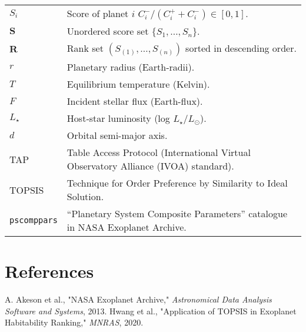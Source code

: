 \documentclass[12pt]{article}
\begin{document}
\begin{tabular}{ll}
$S_i$ & Score of planet $i$ 
$C_i^{-}/(C_i^{+}+C_i^{-})\in[0,1]$.\\
$\mathbf{S}$ & Unordered score set $\{S_1,\dots,S_n\}$.\\
$\mathbf{R}$ & Rank set $(S_{(1)},\dots,S_{(n)})$ sorted in descending order.\\
$r$ & Planetary radius (Earth‐radii).\\
$T$ & Equilibrium temperature (Kelvin).\\
$F$ & Incident stellar flux (Earth-flux).\\
$L_\star$ & Host‐star luminosity (log $\!L_\star/L_\odot$).\\
$d$  & Orbital semi-major axis.\\
TAP & Table Access Protocol (International Virtual Observatory Alliance (IVOA) standard).\\
TOPSIS & Technique for Order Preference by Similarity to Ideal Solution.\\
\texttt{pscomppars} & “Planetary System Composite Parameters” catalogue in NASA Exoplanet Archive.\\

\end{tabular}

\newpage
\section{References}\label{sec:refs}
\begin{thebibliography}{99}
 A. Akeson et al., "NASA Exoplanet Archive," \emph{Astronomical Data Analysis Software and Systems}, 2013.
 Hwang et al., "Application of TOPSIS in Exoplanet Habitability Ranking," \emph{MNRAS}, 2020.  
\end{thebibliography}
\end{document}

